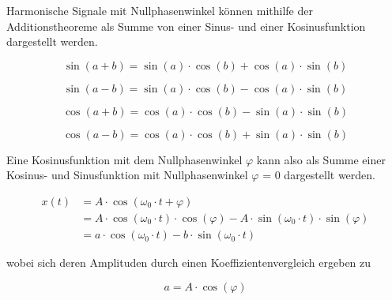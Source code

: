 \noindent Harmonische Signale mit Nullphasenwinkel k\"{o}nnen mithilfe der Additionstheoreme als Summe von einer Sinus- und einer Kosinusfunktion dargestellt werden.

\begin{equation}\label{eq:oneseventytwo}
\sin \left(a+b\right)=\sin \left(a\right)\cdot \cos \left(b\right)+\cos \left(a\right)\cdot \sin \left(b\right)
\end{equation}


\begin{equation}\label{eq:oneseventythree}
\sin \left(a-b\right)=\sin \left(a\right)\cdot \cos \left(b\right)-\cos \left(a\right)\cdot \sin \left(b\right)
\end{equation}


\begin{equation}\label{eq:oneseventyfour}
\cos \left(a+b\right)=\cos \left(a\right)\cdot \cos \left(b\right)-\sin \left(a\right)\cdot \sin \left(b\right)
\end{equation}

\begin{equation}\label{eq:oneseventyfive}
\cos \left(a-b\right)=\cos \left(a\right)\cdot \cos \left(b\right)+\sin \left(a\right)\cdot \sin \left(b\right)
\end{equation}

\noindent Eine Kosinusfunktion mit dem Nullphasenwinkel $\varphi$ kann also als Summe einer Kosinus- und Sinusfunktion mit Nullphasenwinkel $\varphi$ = 0 dargestellt werden.

\begin{equation}\label{eq:oneseventysix}
\begin{split}
x(t) & = A\cdot \cos \left(\omega _{0} \cdot t+\varphi \right) \\ 
 & = A\cdot \cos \left(\omega _{0} \cdot t\right)\cdot \cos \left(\varphi \right)-A\cdot \sin \left(\omega _{0} \cdot t\right)\cdot \sin \left(\varphi \right) \\
 & = a\cdot \cos \left(\omega _{0} \cdot t\right)-b\cdot \sin \left(\omega _{0} \cdot t\right)
\end{split}
\end{equation}

\noindent wobei sich deren Amplituden durch einen Koeffizientenvergleich ergeben zu 

\begin{equation}\label{eq:oneseventyseven}
a=A\cdot \cos \left(\varphi \right)
\end{equation}


